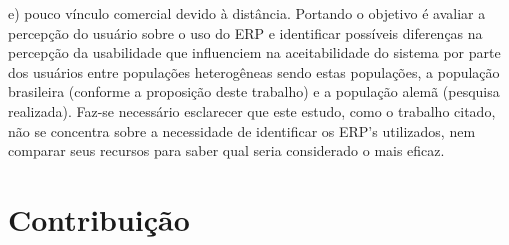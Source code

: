 \indent e)	pouco vínculo comercial devido à distância.\newline
\indent Portando o objetivo é avaliar a percepção do usuário sobre o uso do ERP e identificar possíveis diferenças na percepção da usabilidade que influenciem na aceitabilidade do sistema por parte dos usuários entre populações heterogêneas sendo estas populações, a população brasileira (conforme a proposição deste trabalho) e a população alemã (pesquisa realizada). Faz-se necessário esclarecer que este estudo, como o trabalho citado, não se concentra sobre a necessidade de identificar os ERP’s utilizados, nem comparar seus recursos para saber qual seria considerado o mais eficaz. 

\section{Contribuição}  \label{Contribuição}

